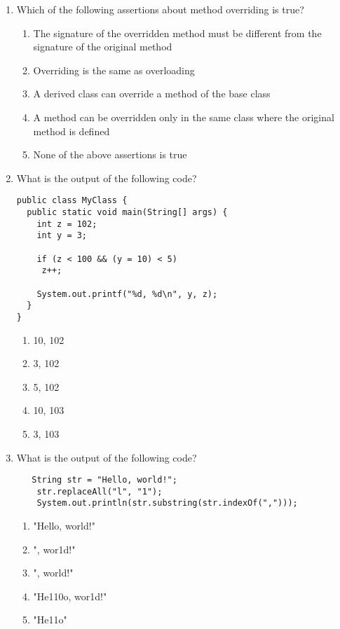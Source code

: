 \documentclass[S17-Final.tex]{subfiles}
\begin{document}
\begin{enumerate}
\item Which of the following assertions about method overriding is true? 

\begin{enumerate}
\item  The signature of the overridden method must be different from the signature of the original method 
\item  Overriding is the same as overloading 
\item  A derived class can override a method of the base class
\item  A method can be overridden only in the same class where the original method is defined 
\item  None of the above assertions is true
\end{enumerate}

\item What is the output of the following code?
\begin{lstlisting}
public class MyClass {
  public static void main(String[] args) {
    int z = 102;
    int y = 3;

    if (z < 100 && (y = 10) < 5)
     z++; 

    System.out.printf("%d, %d\n", y, z);
  }
}
\end{lstlisting}

\begin{enumerate}
\item  10, 102 
\item  3, 102 
\item  5, 102 
\item  10, 103 
\item  3, 103
\end{enumerate}

\item What is the output of the following code?
\begin{lstlisting}
   String str = "Hello, world!";
	str.replaceAll("l", "1");
	System.out.println(str.substring(str.indexOf(",")));
\end{lstlisting}

\begin{enumerate}
\item  "Hello, world!"
\item  ", wor1d!"
\item  ", world!"
\item  "He110o, wor1d!"
\item  "He11o"
\end{enumerate}


\end{enumerate}
\end{document}
